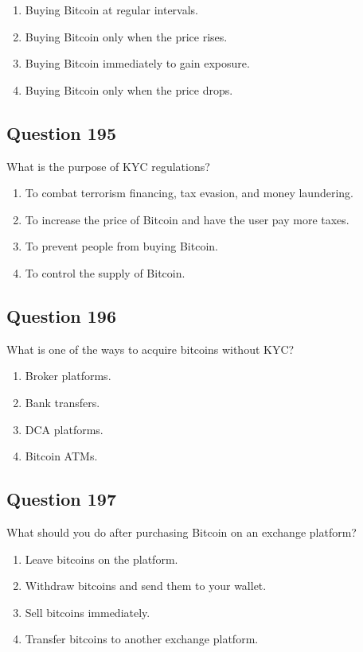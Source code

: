 \documentclass[12pt,a4paper]{article}
\begin{document}
\begin{enumerate}[label=\Alph*., leftmargin=*]
\item Buying Bitcoin at regular intervals.
\item Buying Bitcoin only when the price rises.
\item Buying Bitcoin immediately to gain exposure.
\item Buying Bitcoin only when the price drops.
\end{enumerate}

\bigskip


\subsection*{Question 195}
What is the purpose of KYC regulations?

\begin{enumerate}[label=\Alph*., leftmargin=*]
\item To combat terrorism financing, tax evasion, and money laundering.
\item To increase the price of Bitcoin and have the user pay more taxes.
\item To prevent people from buying Bitcoin.
\item To control the supply of Bitcoin.
\end{enumerate}

\bigskip


\subsection*{Question 196}
What is one of the ways to acquire bitcoins without KYC?

\begin{enumerate}[label=\Alph*., leftmargin=*]
\item Broker platforms.
\item Bank transfers.
\item DCA platforms.
\item Bitcoin ATMs.
\end{enumerate}

\bigskip


\subsection*{Question 197}
What should you do after purchasing Bitcoin on an exchange platform?

\begin{enumerate}[label=\Alph*., leftmargin=*]
\item Leave bitcoins on the platform.
\item Withdraw bitcoins and send them to your wallet.
\item Sell bitcoins immediately.
\item Transfer bitcoins to another exchange platform.
\end{enumerate}
\end{document}
